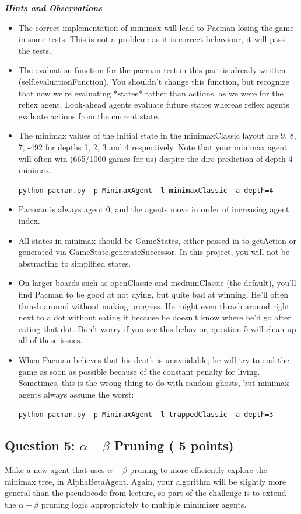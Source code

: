 \documentclass[a4paper, 11pt]{article}
\begin{document}
\textbf{\textit{Hints and Observations}}
  \begin{itemize}\setlength{\itemsep}{-\itemsep}
\item The correct implementation of minimax will lead to Pacman losing the game in some tests. This is not a problem: as it is correct behaviour, it will pass the tests.
\item The evaluation function for the pacman test in this part is already written (self.evaluationFunction). You shouldn't change this function, but recognize that now we're evaluating *states* rather than actions, as we were for the reflex agent. Look-ahead agents evaluate future states whereas reflex agents evaluate actions from the current state.
\item The minimax values of the initial state in the minimaxClassic layout are 9, 8, 7, -492 for depths 1, 2, 3 and 4 respectively. Note that your minimax agent will often win (665/1000 games for us) despite the dire prediction of depth 4 minimax.

  \texttt{python pacman.py -p MinimaxAgent -l minimaxClassic -a depth=4}
\item Pacman is always agent 0, and the agents move in order of increasing agent index.
\item All states in minimax should be GameStates, either passed in to getAction or generated via GameState.generateSuccessor. In this project, you will not be abstracting to simplified states.
\item On larger boards such as openClassic and mediumClassic (the default), you'll find Pacman to be good at not dying, but quite bad at winning. He'll often thrash around without making progress. He might even thrash around right next to a dot without eating it because he doesn't know where he'd go after eating that dot. Don't worry if you see this behavior, question 5 will clean up all of these issues.
\item When Pacman believes that his death is unavoidable, he will try to end the game as soon as possible because of the constant penalty for living. Sometimes, this is the wrong thing to do with random ghosts, but minimax agents always assume the worst:
  
  \texttt{python pacman.py -p MinimaxAgent -l trappedClassic -a depth=3}
  
\end{itemize}
\subsection{Question 5: $\alpha-\beta$ Pruning ( 5 points)}
Make a new agent that uses $\alpha-\beta$ pruning to more efficiently explore the minimax tree, in \textsf{AlphaBetaAgent}. Again, your algorithm will be slightly more general than the pseudocode from lecture, so part of the challenge is to extend the $\alpha-\beta$ pruning logic appropriately to multiple minimizer agents.
\end{document}
